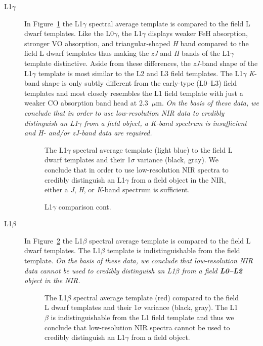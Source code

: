 \documentclass[modern,trackchanges]{aastex61}
\begin{document}
\begin{description}
\item[L1$\gamma$]{
In Figure~\ref{fig:L1lg-field} the L1$\gamma$ spectral average template is compared to the field L dwarf templates.
Like the L0$\gamma$, the L1$\gamma$ displays weaker FeH absorption, stronger VO absorption, and triangular-shaped \emph{H} band compared to the field L dwarf templates thus making the \emph{zJ} and \emph{H} bands of the L1$\gamma$ template distinctive.
Aside from these differences, the \emph{zJ}-band shape of the L1$\gamma$ template is most similar to the L2 and L3 field templates.
The L1$\gamma$ \emph{K}-band shape is only subtly different from the early-type (L0--L3) field templates and most closely resembles the L1 field template with just a weaker CO absorption band head at 2.3~$\mu$m.
\emph{On the basis of these data, we conclude that in order to use low-resolution NIR data to credibly distinguish an L1$\gamma$ from a field object, a \emph{K}-band spectrum is insufficient and \emph{H}- and/or \emph{zJ}-band data are required.}
}

\begin{figure}[b]
    \caption{The L1$\gamma$ spectral average template (light blue) to the field L dwarf templates and their 1$\sigma$ variance (black, gray). We conclude that in order to use low-resolution NIR spectra to credibly distinguish an L1$\gamma$ from a field object in the NIR, either a \emph{J}, \emph{H}, or \emph{K}-band spectrum is sufficient.}
    \label{fig:L1lg-field}
\end{figure}

\begin{figure}
  \caption{L1$\gamma$ comparison cont.}
\end{figure}
\clearpage

\item[L1$\beta$]{
In Figure~\ref{fig:L1b-field} the L1$\beta$ spectral average template is compared to the field L dwarf templates.
The L1$\beta$ template is indistinguishable from the field template.
\emph{On the basis of these data, we conclude that low-resolution NIR data cannot be used to credibly distinguish an L1$\beta$ from a field \textbf{L0--L2} object in the NIR.}}

\begin{figure}[b]
    \caption{The L1$\beta$ spectral average template (red) compared to the field L dwarf templates and their 1$\sigma$ variance (black, gray). The L1$\beta$ is indistinguishable from the L1 field template and thus we conclude that low-resolution NIR spectra cannot be used to credibly distinguish an L1$\gamma$ from a field object.}
    \label{fig:L1b-field}
\end{figure}
\clearpage


\end{description}
\end{document}

